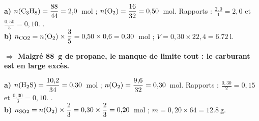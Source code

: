 \documentclass[11pt,a4paper]{article}
\newcommand{\nq}[1]{n_{\text{#1}}}
\newcommand{\rep}[1]{\par\smallskip\noindent\textbf{\color{corrcol}$\Rightarrow$ #1}}
\begin{document}
\begin{cor}
\textbf{a)} $n(\ce{C3H8})=\dfrac{88}{44}=2{,}0$~mol ; $n(\ce{O2})=\dfrac{16}{32}=0{,}50$~mol.
Rapports : $\frac{2{,}0}{1}=2{,}0$ et $\frac{0{,}50}{5}=0{,}10$. .\\
\textbf{b)} $\nq{CO2}=n(\ce{O2})\times\dfrac{3}{5}=0{,}50\times0{,}6=0{,}30$~mol ;
$V=0{,}30\times22{,}4=\boxed{\SI{6,72}{\litre}}$.
\rep{Malgré \SI{88}{\gram} de propane, le manque de  limite tout : le carburant est en large excès.}
\end{cor}

\begin{cor}
\textbf{a)} $n(\ce{H2S})=\dfrac{10{,}2}{34}=0{,}30$~mol ; $n(\ce{O2})=\dfrac{9{,}6}{32}=0{,}30$~mol.
Rapports : $\frac{0{,}30}{2}=0{,}15$ et $\frac{0{,}30}{3}=0{,}10$. .\\
\textbf{b)} $\nq{SO2}=n(\ce{O2})\times\dfrac{2}{3}=0{,}30\times\dfrac{2}{3}=0{,}20$~mol ;
$m=0{,}20\times64=\boxed{\SI{12,8}{\gram}}$.
\end{cor}
\end{document}
